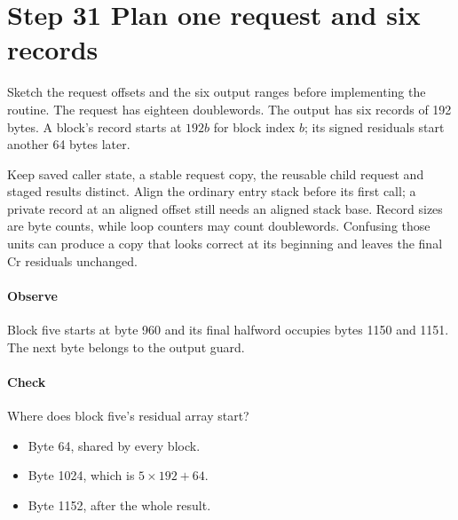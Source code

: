 \section{Step 31 Plan one request and six records}\label{h263-macroblock-s01}
Sketch the request offsets and the six output ranges before implementing the
routine. The request has eighteen doublewords. The output has six records of
192 bytes. A block's record starts at $192b$ for block index $b$; its signed
residuals start another 64 bytes later.

Keep saved caller state, a stable request copy, the reusable child request and
staged results distinct. Align the ordinary entry stack before its first call;
a private record at an aligned offset still needs an aligned stack base.
Record sizes are byte counts, while loop counters may
count doublewords. Confusing those units can produce a copy that looks correct
at its beginning and leaves the final Cr residuals unchanged.

\paragraph{Observe} Block five starts at byte 960 and its final halfword occupies
bytes 1150 and 1151. The next byte belongs to the output guard.
\paragraph{Check} Where does block five's residual array start?
\begin{itemize}
  \item[A.] Byte 64, shared by every block.
  \item[B.] Byte 1024, which is $5\times192+64$.
  \item[C.] Byte 1152, after the whole result.
\end{itemize}
